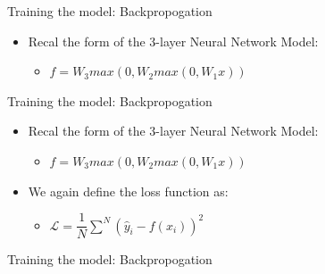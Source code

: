 \documentclass[11pt]{article}
\providecommand{\tightlist}{%
      \setlength{\itemsep}{0pt}\setlength{\parskip}{0pt}}
\begin{document}
    Training the model: Backpropogation

\begin{itemize}
\tightlist
\item
  Recal the form of the 3-layer Neural Network Model:

  \begin{itemize}
  \tightlist
  \item
    \(f = W_3max(0, W_2 max(0, W_1x))\)
  \end{itemize}
\end{itemize}

    Training the model: Backpropogation

\begin{itemize}
\tightlist
\item
  Recal the form of the 3-layer Neural Network Model:

  \begin{itemize}
  \tightlist
  \item
    \(f = W_3max(0, W_2 max(0, W_1x))\)
  \end{itemize}
\item
  We again define the loss function as:

  \begin{itemize}
  \tightlist
  \item
    \(\mathcal{L} = \dfrac{1}{N}\sum^{N}(\hat{y}_i - f(x_i))^{2}\)
  \end{itemize}
\end{itemize}

    Training the model: Backpropogation
\end{document}
